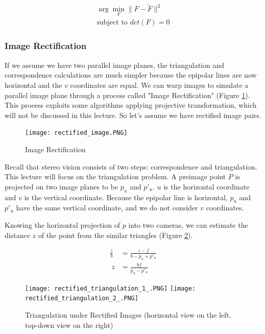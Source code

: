 \documentclass[twoside]{article}
\begin{document}
\begin{align}
\arg\!\min_F \|F-\tilde{F}\|^2 \\
\text{subject to } det(F) = 0
\end{align}

\subsubsection{Image Rectification}

If we assume we have two parallel image planes, the triangulation and correspondence calculations are much simpler because the epipolar lines are now horizontal and the $v$ coordinates are equal. We can warp images to simulate a parallel image plane through a process called "Image Rectification" (Figure \ref{rect}). This process exploits some algorithms applying projective transformation, which will not be discussed in this lecture. So let's assume we have rectified image pairs.

\begin{figure}[h!]
  \begin{center}
	\texttt{[image: rectified\_image.PNG]}  \end{center}
  \caption{Image Rectification}
  \label{rect}
\end{figure}

Recall that stereo vision consists of two steps: correspondence and triangulation. This lecture will focus on the triangulation problem. A preimage point $P$ is projected on two image planes to be $p_u$ and $p'_u$. $u$ is the horizontal coordinate and $v$ is the vertical coordinate. Because the epipolar line is horizontal, $p_u$ and $p'_u$ have the same vertical coordinate, and we do not consider $v$ coordinates.

Knowing the horizontal projection of $p$ into two cameras, we can estimate the distance $z$ of the point from the similar triangles (Figure \ref{recttri}).

\begin{align}
  \frac{z}{b} &= \frac{z-f}{b-p_u+p'_u} \\
  \ z &= \frac{bf}{p_u-p'_u}
\end{align}

\begin{figure}[h!]
  \begin{center}
	\texttt{[image: rectified\_triangulation\_1\_.PNG]}
	\texttt{[image: rectified\_triangulation\_2\_.PNG]}  \end{center}
  \caption{Triangulation under Rectified Images (horizontal view on the left, top-down view on the right)}
  \label{recttri}
\end{figure}
\end{document}
